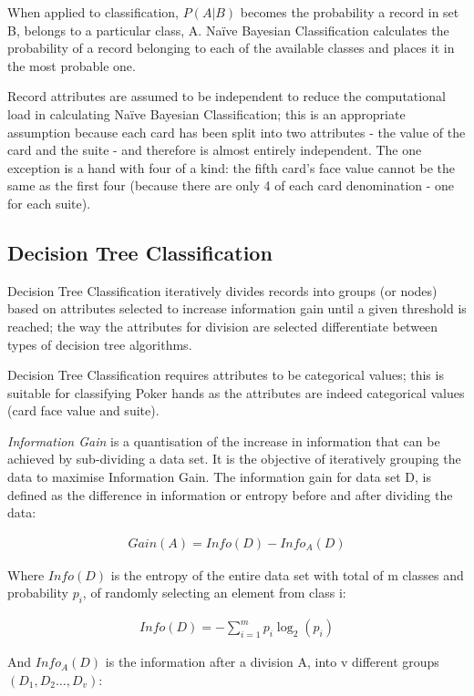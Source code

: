 \documentclass[10pt, a4paper]{article}
\begin{document}
When applied to classification, $P(A|B)$ becomes the probability a record in set B, belongs to a particular class, A. Na\"ive Bayesian Classification calculates the probability of a record belonging to each of the available classes and places it in the most probable one.	

Record attributes are assumed to be independent to reduce the computational load in calculating Na\"ive Bayesian Classification; this is an appropriate assumption because each card has been split into two attributes - the value of the card and the suite - and therefore is almost entirely independent. The one exception is a hand with four of a kind: the fifth card's face value cannot be the same as the first four (because there are only 4 of each card denomination - one for each suite).

\subsection*{Decision Tree Classification}

Decision Tree Classification iteratively divides records into groups (or nodes) based on attributes selected to increase information gain until a given threshold is reached; the way the attributes for division are selected differentiate between types of decision tree algorithms.

Decision Tree Classification requires attributes to be categorical values; this is suitable for classifying Poker hands as the attributes are indeed categorical values (card face value and suite).

\textit{Information Gain} is a quantisation of the increase in information that can be achieved by sub-dividing a data set. It is the objective of iteratively grouping the data to maximise Information Gain. The information gain for data set D, is defined as the difference in information or entropy before and after dividing the data:

\begin{align*}
	Gain(A) = Info(D) - Info_A(D)
\end{align*}

Where $Info(D)$ is the entropy of the entire data set with total of m classes and probability $p_i$, of randomly selecting an element from class i:

\begin{align*}
	Info(D) = - \sum^{m}_{i=1}p_i\log_2(p_i)
\end{align*}

And $Info_A(D)$ is the information after a division A, into v different groups $(D_1,  D_2 \ldots, D_v)$:
\end{document}

